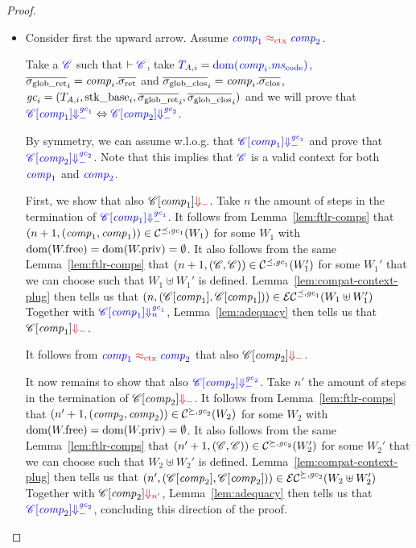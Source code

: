 \documentclass[a4paper]{article}
\begin{document}
\begin{proof}
  \begin{itemize}
  \item Consider first the upward arrow.
    Assume $\comp{\src{\var{comp}_1}} \tconeq \comp{\src{\var{comp}_2}}$.

    Take a $\src{\context}$ such that $\vdash \src{\context}$, take $\src{\ta[,i]}
    = \src{\dom(\var{comp}_i.\mscode)}$, $\gsigrets_i = \var{comp}_i.\sigrets$ and
    $\gsigcloss_i = \var{comp}_i.\sigcloss$, $\gc_i = (\ta[,i],\stkb_i,\gsigrets_i,\gsigcloss_i)$ and we will prove that
    $\src{\plug{\context}{\var{comp}_1} \sterm{\gc_1}} \Leftrightarrow
    \src{\plug{\context}{\var{comp}_2} \sterm{\gc_2}}$.

    By symmetry, we can assume w.l.o.g. that $\src{\plug{\context}{\var{comp}_1} \sterm{\gc_1}}$ and prove that $\src{\plug{\context}{\var{comp}_2} \sterm{\gc_2}}$.
    Note that this implies that $\src{\context}$ is a valid context for both $\src{\var{comp}_1}$ and $\src{\var{comp}_2}$.

    First, we show that also $\plug{\context}{\var{comp}_1} \trg{\term}$.
    Take $n$ the amount of steps in the termination of $\src{\plug{\context}{\var{comp}_1} \sterm{\gc_1}}$.
    It follows from Lemma~\ref{lem:ftlr-comps} that $\npair[n+1]{(\var{comp}_1,\var{comp}_1)} \in \lrcomp[\preceq,\gc_1](W_1)$ for some $W_1$ with $\dom(\pwfree) = \dom(\pwpriv) = \emptyset$.
    It also follows from the same Lemma~\ref{lem:ftlr-comps} that $\npair[n+1]{(\context,\context)} \in \lrcomp[\preceq,\gc_1](W_1')$ for some $W_1'$ that we can choose such that $W_1 \uplus W_1'$ is defined.
    Lemma~\ref{lem:compat-context-plug} then tells us that $\npair{(\plug{\context}{\var{comp}_1}, \plug{\context}{\var{comp}_1})} \in \lrec[\preceq,\gc_1](W_1\uplus W_1')$
    Together with $\src{\plug{\context}{\var{comp}_1} \sterm[n]{\gc_1}}$, Lemma~\ref{lem:adequacy} then tells us that $\plug{\context}{\var{comp}_1} \trg{\term}$.

    It follows from $\comp{\src{\var{comp}_1}} \tconeq \comp{\src{\var{comp}_2}}$ that also $\plug{\context}{\var{comp}_2} \trg{\term}$.

    It now remains to show that also $\src{\plug{\context}{\var{comp}_2} \sterm{\gc_2}}$.
    Take $n'$ the amount of steps in the termination of $\plug{\context}{\var{comp}_2} \trg{\term}$.
    It follows from Lemma~\ref{lem:ftlr-comps} that $\npair[n'+1]{(\var{comp}_2,\var{comp}_2)} \in \lrcomp[\succeq,\gc_2](W_2)$ for some $W_2$ with $\dom(\pwfree) = \dom(\pwpriv) = \emptyset$.
    It also follows from the same Lemma~\ref{lem:ftlr-comps} that $\npair[n'+1]{(\context,\context)} \in \lrcomp[\succeq,\gc_2](W_2')$ for some $W_2'$ that we can choose such that $W_2 \uplus W_2'$ is defined.
    Lemma~\ref{lem:compat-context-plug} then tells us that $\npair[n']{(\plug{\context}{\var{comp}_2}, \plug{\context}{\var{comp}_2})} \in \lrec[\succeq,\gc_2](W_2\uplus W_2')$
    Together with $\plug{\context}{\var{comp}_2} \trg{\term[n']}$, Lemma~\ref{lem:adequacy} then tells us that $\src{\plug{\context}{\var{comp}_2} \sterm{\gc_2}}$, concluding this direction of the proof.


\end{itemize}
\end{proof}
\end{document}
